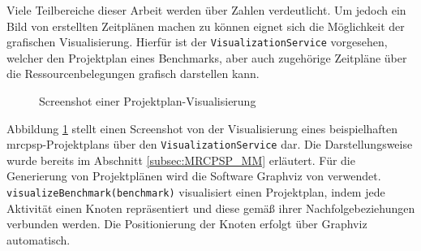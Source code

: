 Viele Teilbereiche dieser Arbeit werden über Zahlen verdeutlicht. Um jedoch ein Bild von erstellten Zeitplänen machen zu können eignet sich die Möglichkeit der grafischen Visualisierung. Hierfür ist der \lstinline|VisualizationService| vorgesehen, welcher den Projektplan eines Benchmarks, aber auch zugehörige Zeitpläne über die Ressourcenbelegungen grafisch darstellen kann.

\begin{figure}[H]
    \centering
    \noindent{}
    \caption{Screenshot einer Projektplan-Visualisierung} 
    \label{img:visualization_projectplan}
\end{figure}

Abbildung \ref{img:visualization_projectplan} stellt einen Screenshot von der Visualisierung eines beispielhaften \ac{mrcpsp}-Projektplans über den \lstinline|VisualizationService| dar. Die Darstellungsweise wurde bereits im Abschnitt \ref{subsec:MRCPSP_MM} erläutert. Für die Generierung von Projektplänen wird die Software Graphviz von \cite{att_graphviz_2021} verwendet. \lstinline|visualizeBenchmark(benchmark)| visualisiert einen Projektplan, indem jede Aktivität einen Knoten repräsentiert und diese gemäß ihrer Nachfolgebeziehungen verbunden werden. Die Positionierung der Knoten erfolgt über Graphviz automatisch.  

